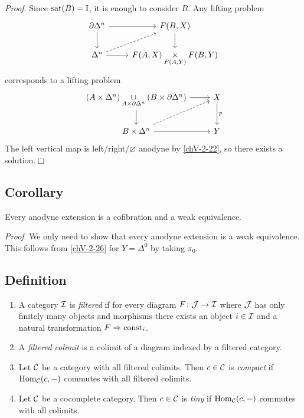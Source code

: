         \emph{Proof}. Since $\operatorname{sat}(B) = \mathrm{I}$, it is enough to consider $B$. Any lifting problem
        \begin{equation*}
            \begin{tikzcd}
                \partial \Delta^n \arrow[r] \arrow[d] & F(B, X) \arrow[d] \\
                \Delta^n \arrow[ur, dashed] \arrow[r] & F(A, X) \underset{F(A, Y)}{\times} F(B, Y)
            \end{tikzcd}
        \end{equation*}
        corresponds to a lifting problem
        \begin{equation*}
            \begin{tikzcd}
                (A \times \Delta^n) \underset{A \times \partial \Delta^n}{\cup} (B \times \partial \Delta^n) \arrow[r] \arrow[d] & X \arrow[d, "p"] \\
                B \times \Delta^n \arrow[ur, dashed] \arrow[r] & Y
            \end{tikzcd}
        \end{equation*}
        The left vertical map is left/right/$\varnothing$ anodyne by \ref{chV-2-22}, so there exists a solution.\hfill$\Box$

    \subsection{Corollary}\label{chV-2-27}
        Every anodyne extension is a cofibration and a weak equivalence.
        \smallskip

        \emph{Proof}. We only need to show that every anodyne extension is a weak equivalence. This follows from \ref{chV-2-26} for $Y = \Delta^0$ by taking $\pi_0$.

    \subsection{Definition}\label{chV-2-28}
        \begin{enumerate}[label=\roman*)]
            \item 
                A category $\mathcal{I}$ is \emph{filtered} if for every diagram $F \colon \mathcal{J} \to \mathcal{I}$ where $\mathcal{J}$ has only finitely many objects and morphisms there exists an object $i \in \mathcal{I}$ and a natural transformation $F \Rightarrow \operatorname{const}_i$.
            \item 
                A \emph{filtered colimit} is a colimit of a diagram indexed by a filtered category.
            \item 
                Let $\mathcal{C}$ be a category with all filtered colimits. Then $c \in \mathcal{C}$ is \emph{compact} if $\operatorname{Hom}_{\mathcal{C}}(c, -)$ commutes with all filtered colimits.
            \item 
                Let $\mathcal{C}$ be a cocomplete category. Then $c \in \mathcal{C}$ is \emph{tiny} if $\operatorname{Hom}_{\mathcal{C}}(c, -)$ commutes with all colimits. 
        \end{enumerate}

